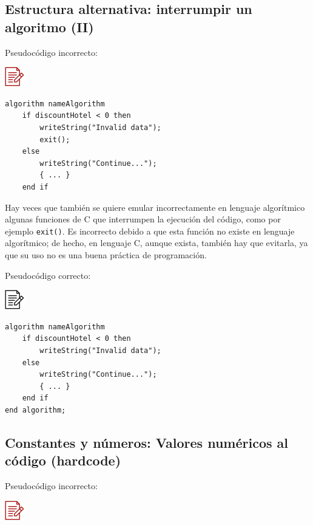 \documentclass[
]{book}
\begin{document}
\hypertarget{estructura-alternativa-interrumpir-un-algoritmo-ii}{%
\subsection{Estructura alternativa: interrumpir un algoritmo (II)}\label{estructura-alternativa-interrumpir-un-algoritmo-ii}}

Pseudocódigo incorrecto:

\includegraphics{./img/alg_err.png}

\begin{verbatim}
algorithm nameAlgorithm
    if discountHotel < 0 then
        writeString("Invalid data");
        exit();
    else
        writeString("Continue...");
        { ... }
    end if
\end{verbatim}

Hay veces que también se quiere emular incorrectamente en lenguaje algorítmico algunas funciones de C que interrumpen la ejecución del código, como por ejemplo \texttt{exit()}. Es incorrecto debido a que esta función no existe en lenguaje algorítmico; de hecho, en lenguaje C, aunque exista, también hay que evitarla, ya que su uso no es una buena práctica de programación.

Pseudocódigo correcto:

\includegraphics{./img/alg.png}

\begin{verbatim}
algorithm nameAlgorithm
    if discountHotel < 0 then
        writeString("Invalid data");
    else
        writeString("Continue...");
        { ... }
    end if
end algorithm;
\end{verbatim}

\hypertarget{constantes-y-nuxfameros-valores-numuxe9ricos-al-cuxf3digo-hardcode}{%
\subsection{Constantes y números: Valores numéricos al código (hardcode)}\label{constantes-y-nuxfameros-valores-numuxe9ricos-al-cuxf3digo-hardcode}}

Pseudocódigo incorrecto:

\includegraphics{./img/alg_err.png}
\end{document}
